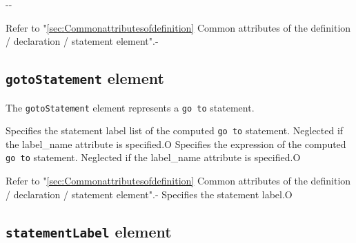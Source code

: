 
\begin{XcodeMLChildElements}
\XcodeMLElementDef{-}
{-}{-}
\end{XcodeMLChildElements}

\begin{XcodeMLAttributes}
{Refer to "\ref{sec:Commonattributesofdefinition} Common attributes of the definition / declaration / statement element".}{-}
\end{XcodeMLAttributes}


\subsection{ {\tt gotoStatement} element}

The {\tt gotoStatement} element represents a {\tt go to} statement.


\begin{XcodeMLChildElements}
{Specifies the statement label list of the computed {\tt go to} statement.
 Neglected if the label\_name attribute is specified.}{O}
{Specifies the expression of the computed {\tt go to} statement.
 Neglected if the label\_name attribute is specified.}{O}
\end{XcodeMLChildElements}

\begin{XcodeMLAttributes}
{Refer to "\ref{sec:Commonattributesofdefinition} Common attributes of the definition / declaration / statement element".}{-}
{Specifies the statement label.}{O}
\end{XcodeMLAttributes}


\subsection{ {\tt statementLabel} element}

